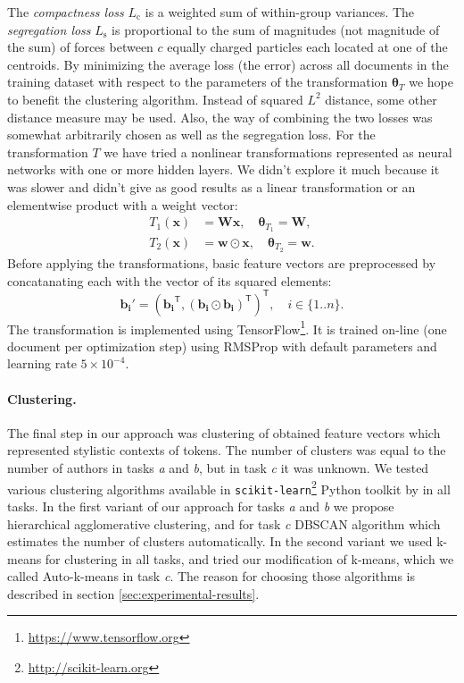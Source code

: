 \documentclass[10pt, a4paper]{article}
\newcommand{\vect}[1]{\bm{#1}}
\newcommand{\matr}[1]{\vect{#1}}
\newcommand{\transpose}{\mathsf T}
\begin{document}
The \emph{compactness loss} $L_\mathrm{c}$ is a weighted sum of within-group variances. The \emph{segregation loss}  $L_\mathrm{s}$ is proportional to the sum of magnitudes (not magnitude of the sum) of forces between $c$ equally charged particles each located at one of the centroids. By minimizing the average loss (the error) across all documents in the training dataset with respect to the parameters of the transformation $\vect{\theta}_T$ we hope to benefit the clustering algorithm. Instead of squared $L^2$ distance, some other distance measure may be used. Also, the way of combining the two losses was somewhat arbitrarily chosen as well as the segregation loss. For the transformation $T$ we have tried a nonlinear transformations represented as neural networks with one or more hidden layers. We didn't explore it much because it was slower and didn't give as good results as a linear transformation or an elementwise product with a weight vector:
\begin{align}
	T_1(\vect{x}) &= \matr{W}\vect{x}, \quad \vect{\theta}_{T_1} = \matr{W}, \\
	T_2(\vect{x}) &= \vect{w}\odot\vect{x}, \quad \vect{\theta}_{T_2} = \vect{w}.
\end{align}
Before applying the transformations, basic feature vectors are preprocessed by concatanating each with the vector of its squared elements:
\begin{equation}
	\vect{b_i'} = (\vect{b_i}^\transpose, (\vect{b_i}\odot\vect{b_i})^\transpose)^\transpose, \quad i\in \{1..n\}.
\end{equation}
The transformation is implemented using TensorFlow\footnote{\url{https://www.tensorflow.org}}. It is trained on-line (one document per optimization step) using RMSProp \citep{tielman-2012} with default parameters and learning rate $5\times 10^{-4}$. 


\paragraph{Clustering.}

The final step in our approach was clustering of obtained feature vectors which represented stylistic contexts of tokens. The number of clusters was equal to the number of authors in tasks \emph{a} and \emph{b}, but in task \emph{c} it was unknown. We tested various clustering algorithms available in \texttt{scikit-learn}\footnote{\url{http://scikit-learn.org}} Python toolkit by \citet{scikit-learn} in all tasks. In the first variant of our approach for tasks  \emph{a} and \emph{b} we propose hierarchical agglomerative clustering, and for task \emph{c} DBSCAN algorithm which estimates the number of clusters automatically. In the second variant we used k-means for clustering in all tasks, and tried our modification of k-means, which we called Auto-k-means in task \emph{c}. The reason for choosing those algorithms is described in section \ref{sec:experimental-results}.
\end{document}
